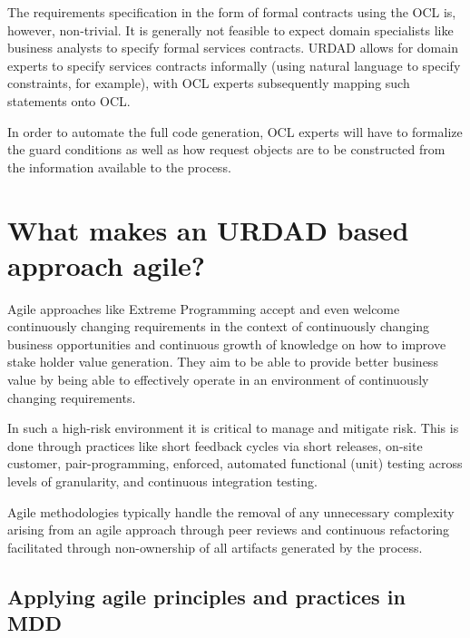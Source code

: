 The requirements specification in the form of formal contracts using the OCL is, however, non-trivial.
It is generally not feasible to expect domain specialists like business analysts to specify  
formal services contracts. URDAD allows for domain experts to specify
services contracts informally (using natural language to specify constraints, for example), 
with OCL experts subsequently mapping such statements onto OCL. 

In order to automate the full code generation, OCL experts will have to formalize the guard conditions
as well as how request objects are to be constructed from the information available to the process.


\section{What makes an URDAD based approach agile?}
\label{sec:urdadAgility}

Agile approaches
\cite{martin:agileSoftwareDevelopment,agileManifesto}
like Extreme Programming \cite{beck:extremeProgrammingExplained2}
accept and even welcome continuously changing requirements in the
context of continuously changing business opportunities and
continuous growth of knowledge on how to improve stake
holder value generation. They aim to be able to provide better business value
by being able to effectively operate in an environment of
continuously changing requirements.

In such a high-risk environment it is critical to manage and mitigate
risk. This is done through practices like short feedback cycles
via short releases, on-site customer, pair-programming,
enforced, automated functional (unit) testing across levels of
granularity, and continuous integration testing.

Agile methodologies typically handle the removal of any unnecessary complexity
arising from an agile approach through peer reviews and continuous refactoring
facilitated through non-ownership of all artifacts generated by the process.


\subsection{Applying agile principles and practices in MDD}

